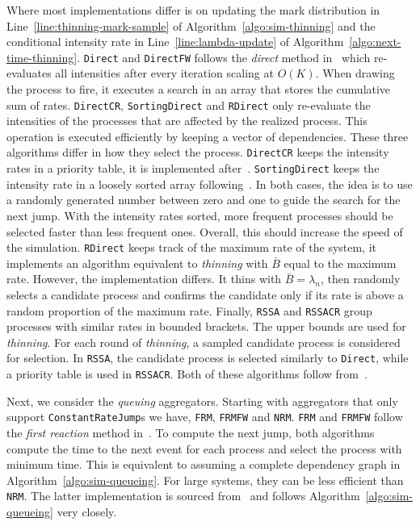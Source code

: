 \documentclass{juliacon}
\numberwithin{equation}{section}
\begin{document}
Where most implementations differ is on updating the mark distribution in Line~\ref{line:thinning-mark-sample} of Algorithm~\ref{algo:sim-thinning} and the conditional intensity rate in Line~\ref{line:lambda-update} of Algorithm~\ref{algo:next-time-thinning}. \texttt{Direct} and \texttt{DirectFW} follows the \textit{direct} method in~\cite{gillespie1976} which re-evaluates all intensities after every iteration scaling at \( O(K) \). When drawing the process to fire, it executes a search in an array that stores the cumulative sum of rates. \texttt{DirectCR}, \texttt{SortingDirect} and \texttt{RDirect} only re-evaluate the intensities of the processes that are affected by the realized process. This operation is executed efficiently by keeping a vector of dependencies. These three algorithms differ in how they select the process. \texttt{DirectCR} keeps the intensity rates in a priority table, it is implemented after~\cite{slepoy2008}. \texttt{SortingDirect} keeps the intensity rate in a loosely sorted array following~\cite{mccollum2006}. In both cases, the idea is to use a randomly generated number between zero and one to guide the search for the next jump. With the intensity rates sorted, more frequent processes should be selected faster than less frequent ones. Overall, this should increase the speed of the simulation. \texttt{RDirect} keeps track of the maximum rate of the system, it implements an algorithm equivalent to \textit{thinning} with \( \bar{B} \) equal to the maximum rate. However, the implementation differs. It thins with \( \bar{B} = \lambda_n \), then randomly selects a candidate process and confirms the candidate only if its rate is above a random proportion of the maximum rate. Finally, \texttt{RSSA} and \texttt{RSSACR} group processes with similar rates in bounded brackets. The upper bounds are used for \textit{thinning}. For each round of \textit{thinning}, a sampled candidate process is considered for selection. In \texttt{RSSA}, the candidate process is selected similarly to \texttt{Direct}, while a priority table is used in \texttt{RSSACR}. Both of these algorithms follow from~\cite{thanh2014,thanh2017}.

Next, we consider the \textit{queuing} aggregators. Starting with aggregators that only support \texttt{ConstantRateJump}s we have, \texttt{FRM}, \texttt{FRMFW} and \texttt{NRM}. \texttt{FRM} and \texttt{FRMFW} follow the \textit{first reaction} method in~\cite{gillespie1976}. To compute the next jump, both algorithms compute the time to the next event for each process and select the process with minimum time. This is equivalent to assuming a complete dependency graph in Algorithm~\ref{algo:sim-queueing}. For large systems, they can be less efficient than \texttt{NRM}. The latter implementation is sourced from~\cite{gibson2000} and follows Algorithm~\ref{algo:sim-queueing} very closely.
\end{document}

